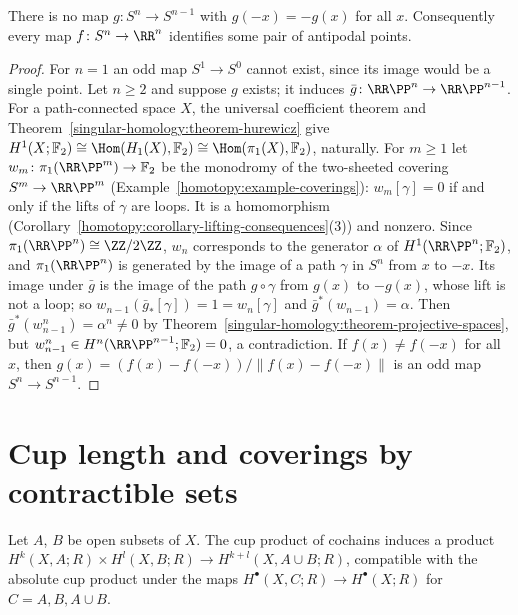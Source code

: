 \begin{corollary}\label{singular-homology:corollary-borsuk-ulam}
There is no map $g \colon S^n \to S^{n-1}$ with $g(-x) = -g(x)$ for all $x$. Consequently every map $f \colon S^n \to \RR^n$ identifies some pair of antipodal points.
\end{corollary}

\begin{proof}
For $n = 1$ an odd map $S^1 \to S^0$ cannot exist, since its image would be a single point. Let $n \geq 2$ and suppose $g$ exists; it induces
$\bar{g} \colon \RR\PP^n \to \RR\PP^{n-1}$. For a path-connected space $X$, the universal coefficient theorem and Theorem~\ref{singular-homology:theorem-hurewicz} give
$H^1(X; \mathbb{F}_2) \cong \Hom(H_1(X), \mathbb{F}_2) \cong \Hom(\pi_1(X), \mathbb{F}_2)$, naturally. For $m \geq 1$ let $w_m \colon \pi_1(\RR\PP^m) \to \mathbb{F}_2$ be the monodromy of
the two-sheeted covering $S^m \to \RR\PP^m$ (Example~\ref{homotopy:example-coverings}): $w_m[\gamma] = 0$ if and only if the lifts of $\gamma$ are loops. It is a
homomorphism (Corollary~\ref{homotopy:corollary-lifting-consequences}(3)) and nonzero. Since $\pi_1(\RR\PP^n) \cong \ZZ/2\ZZ$, $w_n$ corresponds to the generator $\alpha$ of
$H^1(\RR\PP^n; \mathbb{F}_2)$, and $\pi_1(\RR\PP^n)$ is generated by the image of a path $\gamma$ in $S^n$ from $x$ to $-x$. Its image under $\bar{g}$ is the image of the path
$g \circ \gamma$ from $g(x)$ to $-g(x)$, whose lift is not a loop; so $w_{n-1}(\bar{g}_*[\gamma]) = 1 = w_n[\gamma]$ and $\bar{g}^*(w_{n-1}) = \alpha$. Then
$\bar{g}^*(w_{n-1}^n) = \alpha^n \neq 0$ by Theorem~\ref{singular-homology:theorem-projective-spaces}, but $w_{n-1}^n \in H^n(\RR\PP^{n-1}; \mathbb{F}_2) = 0$, a contradiction.
If $f(x) \neq f(-x)$ for all $x$, then $g(x) = (f(x) - f(-x))/\|f(x) - f(-x)\|$ is an odd map $S^n \to S^{n-1}$.
\end{proof}

\section{Cup length and coverings by contractible sets}\label{singular-homology:section-cup-length}

\begin{lemma}\label{singular-homology:lemma-relative-cup}
Let $A$, $B$ be open subsets of $X$. The cup product of cochains induces a product $H^k(X, A; R) \times H^l(X, B; R) \to H^{k+l}(X, A \cup B; R)$, compatible with the absolute cup product under the maps
$H^\bullet(X, C; R) \to H^\bullet(X; R)$ for $C = A, B, A \cup B$.
\end{lemma}

